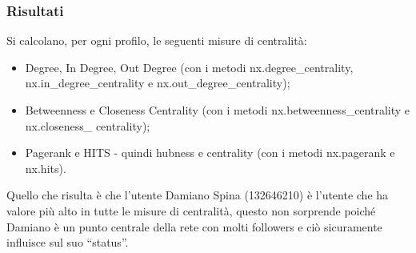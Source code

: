 \documentclass[a4paper, 12pt, twoside]{article}
\begin{document}
\subsubsection{Risultati}
Si calcolano, per ogni profilo, le seguenti misure di centralità:
\begin{itemize}
    \item Degree, In Degree, Out Degree (con i metodi nx.degree\_centrality, nx.in\_degree\_centrality e nx.out\_degree\_centrality);
    \item Betweenness e Closeness Centrality (con i metodi nx.betweenness\_centrality e nx.closeness\_ centrality);
    \item Pagerank e HITS - quindi hubness e centrality (con i metodi nx.pagerank e nx.hits).
\end{itemize}
Quello che risulta è che l’utente Damiano Spina (132646210) è l’utente che ha valore più alto in tutte le misure di centralità, questo non sorprende poiché Damiano è un punto centrale della rete con molti followers e ciò sicuramente influisce sul suo “status”.
\end{document}

